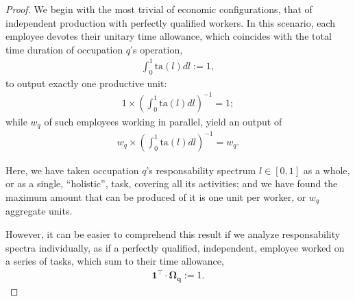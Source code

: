 \documentclass[hidelinks, nonatbib]{elsarticle}
\begin{document}
\begin{lemma}
    \begin{proof}
        We begin with the most trivial of economic configurations, that of independent production with perfectly qualified workers. In this scenario, each employee devotes their unitary time allowance, which coincides with the total time duration of occupation $q$'s operation,
        \begin{gather}
            \int_{0}^{1}{
                \text{ta}(l)
                dl
            }
            :=
            1
            ,
        \end{gather}
        to output exactly one productive unit:
        \begin{gather}
            1
            \times
            \left(
                \int_{0}^{1}{
                    \text{ta}(l)dl
                }
            \right) ^ {-1}
            =
            1
            ;
        \end{gather}
        while $w_q$ of such employees working in parallel, yield an output of
        \begin{align}
            w_q 
            \times 
            \left(
                \int_{0}^{1}{
                    \text{ta}(l)dl
                }
            \right) ^ {-1}
            =
            w_q
            .
        \end{align}
        
        Here, we have taken occupation $q$'s responsability spectrum $l \in [0,1]$ as a whole, or as a single, ``holistic'', task, covering all its activities; and we have found the maximum amount that can be produced of it is one unit per worker, or $w_q$ aggregate units.
        
        However, it can be easier to comprehend this result if we analyze responsability spectra individually, as if a perfectly qualified, independent, employee worked on a series of tasks, which sum to their time allowance,
        \begin{gather}
            \boldsymbol{1} ^ {\top}
            \cdot
            \boldsymbol{\Omega_{q}}
            := 
            1
            .
        \end{gather}
        

\end{proof}
\end{lemma}
\end{document}
